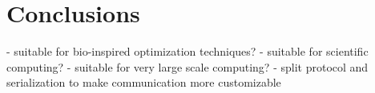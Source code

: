 \chapter{Conclusions}
\label{chap:conclusions}
- suitable for bio-inspired optimization techniques?
- suitable for scientific computing?
- suitable for very large scale computing?
- split protocol and serialization to make communication more customizable